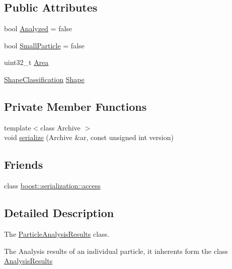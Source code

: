 \subsection*{Public Attributes}
\begin{DoxyCompactItemize}
\item 
bool \hyperlink{class_soil_analyzer_1_1_particle_analysis_results_abfb8465c0cfbe9a6ad4d844f6269676f}{Analyzed} = false
\item 
bool \hyperlink{class_soil_analyzer_1_1_particle_analysis_results_a8aaa7f053d68bce6f1ad2b7bcd30cd95}{Small\+Particle} = false
\item 
uint32\+\_\+t \hyperlink{class_soil_analyzer_1_1_particle_analysis_results_a1a6dbe8880b29f51ba3d8ec28b96ed45}{Area}
\item 
\hyperlink{class_shape_classification}{Shape\+Classification} \hyperlink{class_soil_analyzer_1_1_particle_analysis_results_a75230aa0675b2df489c08bcfffb43b97}{Shape}
\end{DoxyCompactItemize}
\subsection*{Private Member Functions}
\begin{DoxyCompactItemize}
\item 
{\footnotesize template$<$class Archive $>$ }\\void \hyperlink{class_soil_analyzer_1_1_particle_analysis_results_a89c11362f5cb934006c6d67d1b51eef4}{serialize} (Archive \&ar, const unsigned int version)
\end{DoxyCompactItemize}
\subsection*{Friends}
\begin{DoxyCompactItemize}
\item 
class \hyperlink{class_soil_analyzer_1_1_particle_analysis_results_ac98d07dd8f7b70e16ccb9a01abf56b9c}{boost\+::serialization\+::access}
\end{DoxyCompactItemize}


\subsection{Detailed Description}
The \hyperlink{class_soil_analyzer_1_1_particle_analysis_results}{Particle\+Analysis\+Results} class. 

The Analysis results of an individual particle, it inherents form the class \hyperlink{class_soil_analyzer_1_1_analysis_results}{Analysis\+Results} 

